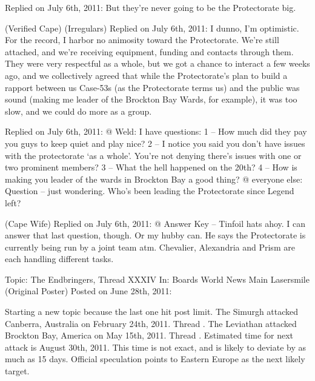 Replied on July 6th, 2011:
But they're never going to be the Protectorate big.



\blacktriangleright {} (Verified Cape) (Irregulars)
Replied on July 6th, 2011:
I dunno, I'm optimistic. \winky
For the record, I harbor no animosity toward the Protectorate.  We're still attached, and we're receiving equipment, funding and contacts through them.  They were very respectful as a whole, but we got a chance to interact a few weeks ago, and we collectively agreed that while the Protectorate's plan to build a rapport between us Case-53s (as the Protectorate terms us) and the public was sound (making me leader of the Brockton Bay Wards, for example), it was too slow, and we could do more as a group.



\blacktriangleright {}
Replied on July 6th, 2011:
@ Weld:
I have questions:
1 – How much did they pay you guys to keep quiet and play nice?
2 – I notice you said you don't have issues with the protectorate `as a whole'.  You're not denying there's issues with one or two prominent members?
3 – What the hell happened on the 20th?
4 – How is making you leader of the wards in Brockton Bay a good thing?
@ everyone else:
Question – just wondering.  Who's been leading the Protectorate since Legend left?



(Cape Wife)
Replied on July 6th, 2011:
@ Answer Key – Tinfoil hats ahoy.  I can answer that last question, though.  Or my hubby can.  He says the Protectorate is currently being run by a joint team atm.  Chevalier, Alexandria and Prism are each handling different tasks.






\blacksquare



\blacklozenge  Topic:  The Endbringers, Thread XXXIV
In:  Boards \blacktriangleright World News \blacktriangleright Main
Lasersmile (Original Poster)
Posted on June 28th, 2011:



Starting a new topic because the last one hit post limit.
The Simurgh attacked Canberra, Australia on February 24th, 2011.  Thread \underline{}.
The Leviathan attacked Brockton Bay, America on May 15th, 2011.  Thread \underline{}.
Estimated time for next attack is August 30th, 2011.  This time is not exact, and is likely to deviate by as much as 15 days.
Official speculation points to Eastern Europe as the next likely target.



